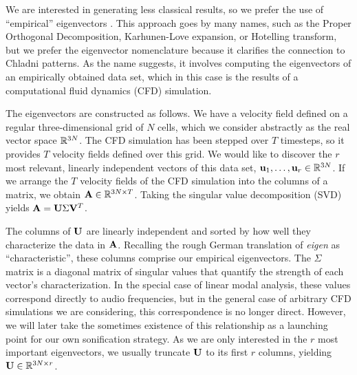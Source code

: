 \documentclass[11pt]{article}
\begin{document}

We are interested in generating less classical results, so we prefer the use of ``empirical'' eigenvectors \cite{Ryckelynck2005}. This approach goes by many names, such as the Proper Orthogonal Decomposition, Karhunen-Love expansion, or Hotelling transform, but we prefer the eigenvector nomenclature because it clarifies the connection to Chladni patterns. As the name suggests, it involves computing the eigenvectors of an empirically obtained data set, which in this case is the results of a computational fluid dynamics (CFD) simulation.

The eigenvectors are constructed as follows. We have a velocity field defined on a regular three-dimensional grid of $N$ cells, which we consider abstractly as the real vector space $\mathbb{R}^{3N}$. The CFD simulation has been stepped over $T$ timesteps, so it provides $T$ velocity fields defined over this grid. We would like to discover the $r$ most relevant, linearly independent vectors of this data set, $\mathbf{u}_1, \ldots, \mathbf{u}_r \in \mathbb{R}^{3N}$. If we arrange the $T$ velocity fields of the CFD simulation into the columns of a matrix, we obtain $\mathbf{A} \in \mathbb{R}^{3N \times T}$. Taking the singular value decomposition (SVD) yields $\mathbf{A} = \mathbf{U} \Sigma \mathbf{V}^T$.

The columns of $\mathbf{U}$ are linearly independent and sorted by how well they characterize the data in $\mathbf{A}$. Recalling the rough German translation of {\em eigen} as ``characteristic'', these columns comprise our empirical eigenvectors. The $\Sigma$ matrix is a diagonal matrix of singular values that quantify the strength of each vector's characterization. In the special case of linear modal analysis, these values correspond directly to audio frequencies, but in the general case of arbitrary CFD simulations we are considering, this correspondence is no longer direct. However, we will later take the sometimes existence of this relationship as a launching point for our own sonification strategy. As we are only interested in the $r$ most important eigenvectors, we usually truncate $\mathbf{U}$ to its first $r$ columns, yielding $\mathbf{U} \in \mathbb{R}^{3N \times r}$.
\end{document}
